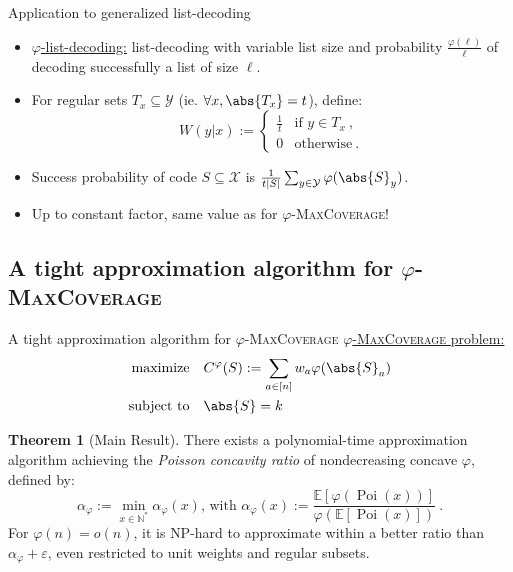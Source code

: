 \documentclass{beamer}
\theoremstyle{definition}
\newtheorem{theo}{Theorem}[section]
\theoremstyle{remark}
\DeclareMathOperator{\Poi}{\text{Poi}}
\DeclareMathOperator{\maxi}{\text{maximize}}
\DeclareMathOperator{\st}{\text{subject to}}
\begin{document}
\begin{frame}{Application to generalized list-decoding}
  \begin{itemize}
  \item \underline{$\varphi$-list-decoding:} list-decoding with variable list size and probability $\frac{\varphi(\ell)}{\ell}$ of decoding successfully a list of size $\ell$.
    \pause
    \bigskip
  \item For regular sets $T_x \subseteq \mathcal{Y}$ (ie. $\forall x, \abs{T_x}=t$), define:
    \[ W(y|x) := \begin{cases}
      \frac{1}{t} & \text{if } y \in T_x\ ,\\
      0 & \text{otherwise}\ .
    \end{cases}\]
  \item Success probability of code $S \subseteq \mathcal{X}$ is $\frac{1}{t|S|}\sum_{y \in \mathcal{Y}} \varphi(\abs{S}_y)$.
    \bigskip
    \pause
  \item Up to constant factor, same value as for $\varphi$-\textsc{MaxCoverage}!
  \end{itemize}
\end{frame}

\subsection{A tight approximation algorithm for $\varphi$-\textsc{MaxCoverage}}
\begin{frame}{A tight approximation algorithm for $\varphi$-\textsc{MaxCoverage}}
  \underline{$\varphi$-\textsc{MaxCoverage} problem:}
    \begin{align*}
      \maxi &&& C^{\varphi}(S) := \sum_{a \in [n]} w_a\varphi(\abs{S}_a)\\
      \st &&& \abs{S} = k
    \end{align*}

  \pause
  
  \begin{theo}[Main Result]
    There exists a polynomial-time approximation algorithm achieving the \emph{Poisson concavity ratio} of nondecreasing concave $\varphi$, defined by:
    \[ \alpha_{\varphi} := \min_{x \in \mathbb{N}^*} \alpha_{\varphi}(x) \text{, with } \alpha_{\varphi}(x) := \frac{\mathbb{E}[\varphi(\Poi(x))]}{\varphi(\mathbb{E}[\Poi(x)])}\ .\]
    For $\varphi(n) = o(n)$, it is \textrm{NP}-hard to approximate within a better ratio than $\alpha_\varphi + \varepsilon$, even restricted to unit weights and regular subsets.
  \end{theo}
\end{frame}
\end{document}
